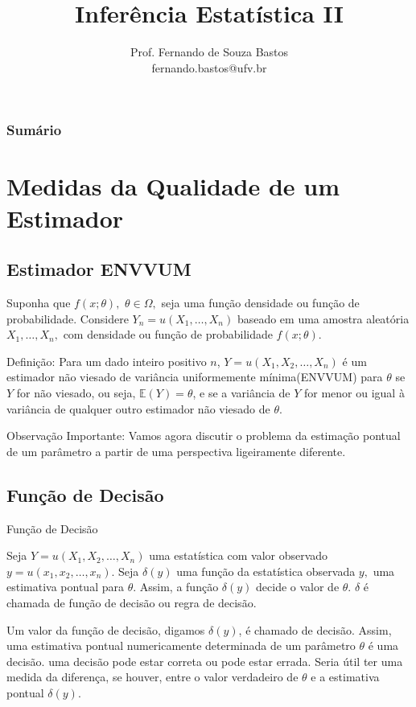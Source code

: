 \documentclass[12pt]{beamer}
\title{Inferência Estatística II}
\author{Prof. Fernando de Souza Bastos\texorpdfstring{\\ fernando.bastos@ufv.br}{}}
\institute{Departamento de Estatística\texorpdfstring{\\ Programa de Pós-Graduação em Estatística Aplicada e Biometria}\texorpdfstring{\\ Universidade Federal de Viçosa}{}\texorpdfstring{\\ Campus UFV - Viçosa}{}}
\date{}
\begin{document}

\frame{\titlepage}

\begin{frame}{}
\frametitle{\bf Sumário}
\tableofcontents
\end{frame}
\section{Medidas da Qualidade de um Estimador}
\subsection{Estimador ENVVUM}
\begin{frame}{}
\begin{block}{}
\justifying
Suponha que $f(x; \theta),$ $\theta \in \Omega,$ seja uma função densidade ou função de probabilidade. Considere $Y_n = u(X_1, \ldots, X_n)$ baseado em uma amostra aleatória $X_1, \ldots, X_n,$ com densidade ou função de probabilidade $f(x; \theta).$
\end{block}
\pause
\begin{block}{Definição:}
\justifying
Para um dado inteiro positivo $n$, $Y = u(X_1,X_2, \ldots, X_n)$ é um estimador não viesado de variância uniformemente mínima(ENVVUM) para $\theta$ se $Y$ for não viesado, ou seja, $\mathbb{E}(Y) = \theta$, e se a variância de $Y$ for menor ou igual à variância de qualquer outro estimador não viesado de $\theta$.
\end{block}
\end{frame}

\begin{frame}{}
\begin{block}{Observação Importante:}
\justifying
Vamos agora discutir o problema da estimação pontual de um parâmetro a partir de uma perspectiva ligeiramente diferente.
\end{block}
\end{frame}

\subsection{Função de Decisão}
\begin{frame}{Função de Decisão}
\begin{block}{}
\justifying
Seja $Y = u(X_1,X_2, \ldots, X_n)$ uma estatística com valor observado $y = u(x_1,x_2, \ldots, x_n)$. Seja $\delta(y)$ uma função da estatística observada $y,$ uma estimativa pontual para $\theta$. Assim, a função $\delta(y)$ decide o valor de $\theta.$  $\delta$ é chamada de função de decisão ou regra de decisão.
\end{block}
\pause
\begin{block}{}
\justifying
Um valor da função de decisão, digamos $\delta(y)$, é chamado de decisão. Assim, uma estimativa pontual numericamente determinada de um parâmetro $\theta$ é uma decisão. uma decisão pode estar correta ou pode estar errada. Seria útil ter uma medida da diferença, se houver, entre o valor verdadeiro de $\theta$ e a estimativa pontual $\delta(y)$.
\end{block}
\end{frame}
\end{document}
